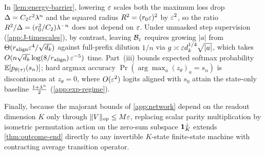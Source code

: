 \begin{remark}
\label{rem:outcome-scale}
In \cref{lem:energy-barrier}, lowering $\varepsilon$ scales both the maximum loss drop $\Delta = C_2\varepsilon^2\lambda^n$ and the squared radius $R^2 = (r_0\varepsilon)^2$ by $\varepsilon^2$, so the ratio $R^2/\Delta = (r_0^2/C_2)\lambda^{-n}$ does not depend on $\varepsilon$. Under unmasked step supervision (\cref{app:J-timescales}), by contrast, leaving $\mathcal B_{\varepsilon}$ requires growing $|a|$ from $\Theta(r_{\mathrm{align}}\varepsilon^4/\sqrt{d_k})$ against full-prefix dilution $1/n$ via $g \asymp \varepsilon d_k^{1/4}\sqrt{|a|}$, which takes $O(n\sqrt{d_k}\log(8/r_{\mathrm{align}})\,\varepsilon^{-5})$ time. Part~(iii) bounds expected softmax probability $\mathbb E[p_{\theta(\tau)}(s_n)]$; hard argmax accuracy $\Pr(\arg\max_a (z_\theta)_a = s_n)$ is discontinuous at $z_\theta = 0$, where $O(\varepsilon^2)$ logits aligned with $s_0$ attain the state-only baseline $\frac{1+\lambda^n}{2}$ (\cref{app:exp-regime}).
\end{remark}

Finally, because the majorant bounds of \cref{app:network} depend on the readout dimension $K$ only through $\|V\|_{\mathrm{op}} \le M\varepsilon$, replacing scalar parity multiplication by isometric permutation action on the zero-sum subspace $\mathbf 1_K^\perp$ extends \cref{thm:outcome-end} directly to any invertible $K$-state finite-state machine with contracting average transition operator.

